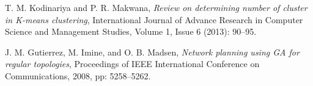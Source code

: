 \documentclass[conference,compsoc]{IEEEtran}
\begin{document}
\begin{thebibliography}{1}
T. M. Kodinariya and P. R. Makwana, \emph{Review on determining number of cluster in K-means clustering}, International Journal of Advance Research in
Computer Science and Management Studies, Volume 1, Issue 6 (2013): 90--95.


J. M. Gutierrez, M. Imine, and O. B. Madsen, \emph{Network planning using GA for regular topologies}, Proceedings of IEEE International Conference on Communications, 2008, pp: 5258--5262.









\end{thebibliography}
 
 
 
 
\end{document}
